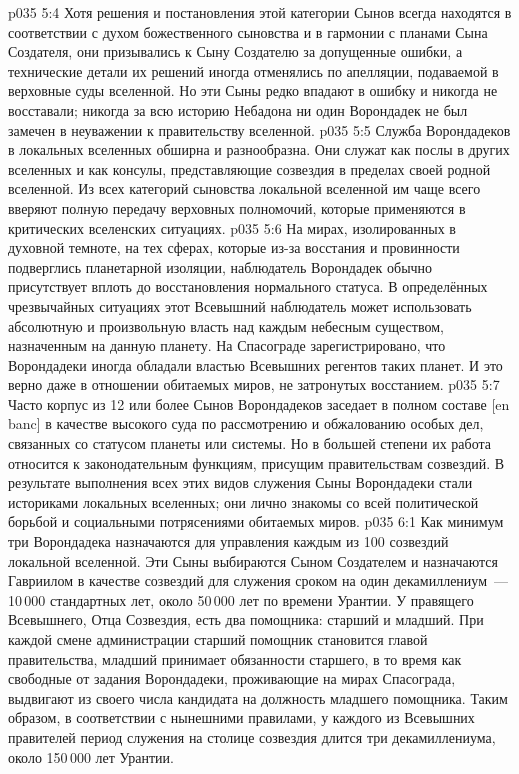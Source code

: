 \vs p035 5:4 Хотя решения и постановления этой категории Сынов всегда находятся в соответствии с духом божественного сыновства и в гармонии с планами Сына Создателя, они призывались к Сыну Создателю за допущенные ошибки, а технические детали их решений иногда отменялись по апелляции, подаваемой в верховные суды вселенной. Но эти Сыны редко впадают в ошибку и никогда не восставали; никогда за всю историю Небадона ни один Ворондадек не был замечен в неуважении к правительству вселенной.
\vs p035 5:5 Служба Ворондадеков в локальных вселенных обширна и разнообразна. Они служат как послы в других вселенных и как консулы, представляющие созвездия в пределах своей родной вселенной. Из всех категорий сыновства локальной вселенной им чаще всего вверяют полную передачу верховных полномочий, которые применяются в критических вселенских ситуациях.
\vs p035 5:6 На мирах, изолированных в духовной темноте, на тех сферах, которые из-за восстания и провинности подверглись планетарной изоляции, наблюдатель Ворондадек обычно присутствует вплоть до восстановления нормального статуса. В определённых чрезвычайных ситуациях этот Всевышний наблюдатель может использовать абсолютную и произвольную власть над каждым небесным существом, назначенным на данную планету. На Спасограде зарегистрировано, что Ворондадеки иногда обладали властью Всевышних регентов таких планет. И это верно даже в отношении обитаемых миров, не затронутых восстанием.
\vs p035 5:7 Часто корпус из 12 или более Сынов Ворондадеков заседает в полном составе [en banc] в качестве высокого суда по рассмотрению и обжалованию особых дел, связанных со статусом планеты или системы. Но в большей степени их работа относится к законодательным функциям, присущим правительствам созвездий. В результате выполнения всех этих видов служения Сыны Ворондадеки стали историками локальных вселенных; они лично знакомы со всей политической борьбой и социальными потрясениями обитаемых миров.
\vs p035 6:1 Как минимум три Ворондадека назначаются для управления каждым из 100 созвездий локальной вселенной. Эти Сыны выбираются Сыном Создателем и назначаются Гавриилом в качестве  созвездий для служения сроком на один декамиллениум~--- 10\,000 стандартных лет, около 50\,000 лет по времени Урантии. У правящего Всевышнего, Отца Созвездия, есть два помощника: старший и младший. При каждой смене администрации старший помощник становится главой правительства, младший принимает обязанности старшего, в то время как свободные от задания Ворондадеки, проживающие на мирах Спасограда, выдвигают из своего числа кандидата на должность младшего помощника. Таким образом, в соответствии с нынешними правилами, у каждого из Всевышних правителей период служения на столице созвездия длится три декамиллениума, около 150\,000 лет Урантии.
